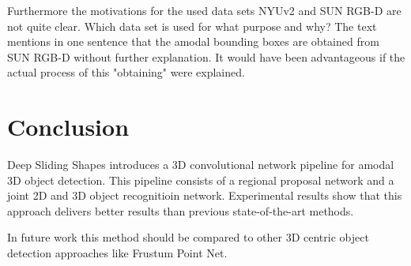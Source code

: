\documentclass[12pt]{scrartcl}
\begin{document}
Furthermore the motivations for the used data sets NYUv2 and SUN RGB-D are
not quite clear. Which data set is used for what purpose and why? The text
mentions in one sentence that the amodal bounding boxes are obtained from
SUN RGB-D without further explanation. It would have been advantageous
if the actual process of this "obtaining" were explained.



\section{Conclusion}

Deep Sliding Shapes introduces a 3D convolutional network pipeline for
amodal 3D object detection. This pipeline consists of a regional proposal
network and a joint 2D and 3D object recognitioin network. Experimental
results show that this approach delivers better results than previous
state-of-the-art methods.

In future work this method should be compared to other 3D centric object detection
approaches like Frustum Point Net\cite{Qi2017}.

\newpage
\printbibliography
{}%
\end{document}
